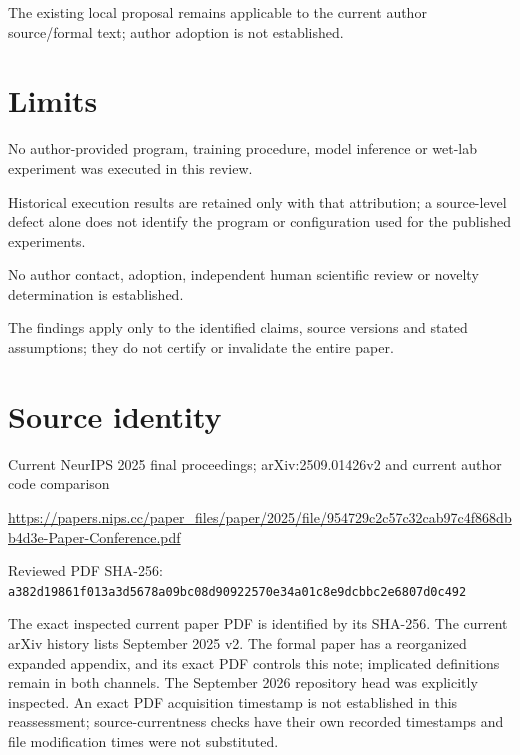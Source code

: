 \documentclass[11pt]{article}
\begin{document}
The existing local proposal remains applicable to the current author source/formal text; author adoption is not established.

\section*{Limits}

No author-provided program, training procedure, model inference or wet-lab experiment was executed in this review.\par

Historical execution results are retained only with that attribution; a source-level defect alone does not identify the program or configuration used for the published experiments.\par

No author contact, adoption, independent human scientific review or novelty determination is established.\par

The findings apply only to the identified claims, source versions and stated assumptions; they do not certify or invalidate the entire paper.\par

\section*{Source identity}

Current NeurIPS 2025 final proceedings; arXiv:2509.01426v2 and current author code comparison

\url{https://papers.nips.cc/paper_files/paper/2025/file/954729c2c57c32cab97c4f868dbb4d3e-Paper-Conference.pdf}

Reviewed PDF SHA-256: \nolinkurl{a382d19861f013a3d5678a09bc08d90922570e34a01c8e9dcbbc2e6807d0c492}

The exact inspected current paper PDF is identified by its SHA-256. The current arXiv history lists September 2025 v2. The formal paper has a reorganized expanded appendix, and its exact PDF controls this note; implicated definitions remain in both channels. The September 2026 repository head was explicitly inspected. An exact PDF acquisition timestamp is not established in this reassessment; source-currentness checks have their own recorded timestamps and file modification times were not substituted.
\end{document}
